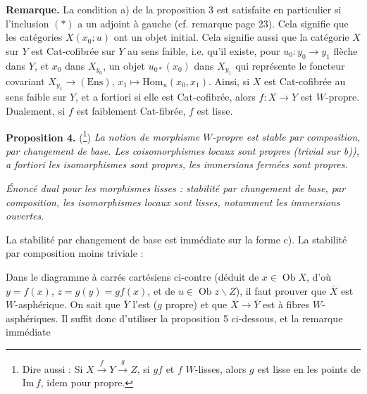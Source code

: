 \documentclass[11pt]{article}
\newcommand{\msp}[1]{\marginpar{\footnotesize [#1]}}
\newcommand{\Ob}{\operatorname{Ob}}
\begin{document}
\textbf{Remarque.} La condition a) de la proposition 3 est satisfaite en particulier si l'inclusion $(*)$ a un adjoint à gauche (cf. remarque page 23). Cela signifie que les catégories $X(x_0;u)$ ont un objet initial. Cela signifie aussi que la catégorie $X$ sur $Y$ est Cat-cofibrée sur $Y$ au sens faible, i.e. qu'il existe, pour $u_0 : y_0 \longrightarrow y_1$ flèche dans $Y$, et $x_0$ dans $X_{y_0}$, un objet $u_{0*}(x_0)$ dans $X_{y_1}$ qui représente le foncteur covariant $X_{y_1} \longrightarrow (\mathrm{Ens})$, $x_1 \longmapsto \mathrm{Hom}_u(x_0, x_1)$. Ainsi, si $X$ est Cat-cofibrée au sens faible sur $Y$, et a fortiori si elle est Cat-cofibrée, alors $f : X \longrightarrow Y$ est $W$-propre. Dualement, si $f$ est faiblement Cat-fibrée, $f$ est lisse.

\textbf{Proposition 4.} (\footnote[43]{Dire aussi : Si $X \xrightarrow{f} Y \xrightarrow{g} Z$, si $gf$ et $f$ $W$-lisses, alors $g$ est lisse en les points de $\mathrm{Im}\, f$, idem pour propre.}) \textit{La notion de morphisme $W$-propre est stable par composition, par changement de base. Les coisomorphismes locaux sont propres (trivial sur b)), a fortiori les isomorphismes sont propres, les immersions fermées sont propres.}

\textit{Énoncé dual pour les morphismes lisses : stabilité par changement de base, par composition, les isomorphismes locaux sont lisses, notamment les immersions ouvertes.}

\msp{page 29}La stabilité par changement de base est immédiate sur la forme c). La stabilité par composition moins triviale :

\begin{center}
\end{center}

Dans le diagramme à carrés cartésiens ci-contre (déduit de $x \in \Ob X$, d'où $y = f(x)$, $z = g(y) = gf(x)$, et de $u \in \Ob z\backslash Z$), il faut prouver que $\bar{X}$ est $W$-asphérique. On sait que $\bar{Y}$ l'est ($g$ propre) et que $\bar{X} \longrightarrow \bar{Y}$ est à fibres $W$-asphériques. Il suffit donc d'utiliser la proposition 5 ci-dessous, et la remarque immédiate %
\end{document}
